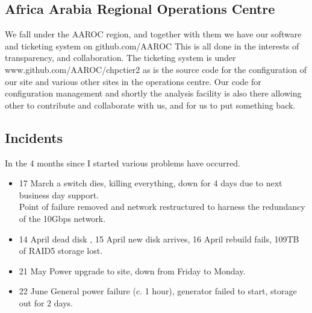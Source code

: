 \documentclass[a4paper]{jpconf}
\begin{document}
\subsection{Africa Arabia Regional Operations Centre} 
We fall under the AAROC region, and together with them we have our software and ticketing system on github.com/AAROC
This is all done in the interests of transparency, and collaboration. The ticketing system is under www.github.com/AAROC/chpctier2
as is the source code for the configuration of our site and various other sites in the operations centre.
Our code for configuration management and shortly the analysis facility is also there allowing other to contribute and 
collaborate with us, and for us to put something back.

\subsection{Incidents}
In the 4 months since I started various problems have occurred.
\begin{itemize}
  \item 17 March a switch dies, killing everything, down for 4 days due to next business day support.\\
    Point of failure removed and network restructured to harness the redundancy of the 10Gbps network.
  \item 14 April dead disk , 15 April new disk arrives, 16 April rebuild fails, 109TB of RAID5 storage lost.
  \item 21 May Power upgrade to site, down from Friday to Monday.
  \item 22 June General power failure (c. 1 hour), generator failed to start, storage out for 2 days.
\end{itemize}
\end{document}
